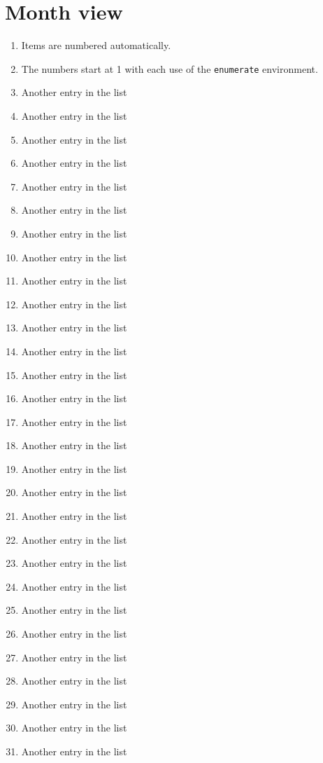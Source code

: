 \documentclass[a5paper,11pt]{article}
\begin{document}
\section*{Month view}
\begin{enumerate}
	\item Items are numbered automatically.
	\item The numbers start at 1 with each use of the \texttt{enumerate} environment.
	\item Another entry in the list
	\item Another entry in the list
	\item Another entry in the list
	\item Another entry in the list
	\item Another entry in the list
	\item Another entry in the list
	\item Another entry in the list
	\item Another entry in the list
	\item Another entry in the list
	\item Another entry in the list
	\item Another entry in the list
	\item Another entry in the list
	\item Another entry in the list
	\item Another entry in the list
	\item Another entry in the list
	\item Another entry in the list
	\item Another entry in the list
	\item Another entry in the list
	\item Another entry in the list
	\item Another entry in the list
	\item Another entry in the list
	\item Another entry in the list
	\item Another entry in the list
	\item Another entry in the list
	\item Another entry in the list
	\item Another entry in the list
	\item Another entry in the list
	\item Another entry in the list
	\item Another entry in the list
\end{enumerate}	
\newpage
\end{document}
